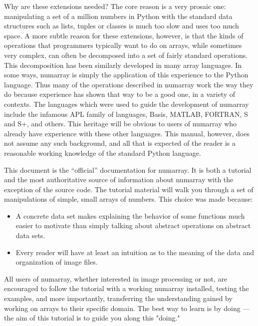 Why are these extensions needed? The core reason is a very prosaic one:
manipulating a set of a million numbers in Python with the
standard data structures such as lists, tuples or classes is much too slow and
uses too much space. A more subtle
reason for these extensions, however, is that the kinds of operations that
programmers typically want to do on arrays, while sometimes very complex, can
often be decomposed into a set of fairly standard operations. This
decomposition has been similarly developed in many array languages. In some
ways, numarray is simply the application of this experience to the Python
language.  Thus many of the operations described in numarray work the way they
do because experience has shown that way to be a good one, in a variety of
contexts. The languages which were used to guide the development of numarray
include the infamous APL family of languages, Basis, MATLAB, FORTRAN, S and S+,
and others.  This heritage will be obvious to users of numarray who already
have experience with these other languages.  This manual, however, does not
assume any such background, and all that is expected of the reader is a
reasonable working knowledge of the standard Python language.

This document is the ``official'' documentation for numarray. It is both a
tutorial and the most authoritative source of information about numarray with
the exception of the source code. The tutorial material will walk you through a
set of manipulations of simple, small arrays of numbers. This choice was made
because:
\begin{itemize}
\item A concrete data set makes explaining the behavior of some functions much
   easier to motivate than simply talking about abstract operations on abstract
   data sets.
\item Every reader will have at least an intuition as to the meaning of the
   data and organization of image files.  
\end{itemize}
All users of numarray, whether interested in image processing or not, are
encouraged to follow the tutorial with a working numarray installed,
testing the examples, and more importantly, transferring the
understanding gained by working on arrays to their specific domain. The best
way to learn is by doing --- the aim of this tutorial is to guide you along
this "doing."

